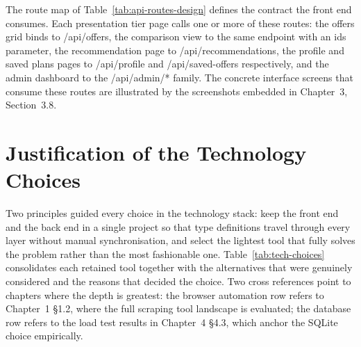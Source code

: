 The route map of Table~\ref{tab:api-routes-design} defines the contract the front end consumes. Each presentation tier page calls one or more of these routes: the offers grid binds to /api/offers, the comparison view to the same endpoint with an ids parameter, the recommendation page to /api/recommendations, the profile and saved plans pages to /api/profile and /api/saved-offers respectively, and the admin dashboard to the /api/admin/* family. The concrete interface screens that consume these routes are illustrated by the screenshots embedded in Chapter~3, Section~3.8.

\section{Justification of the Technology Choices}

Two principles guided every choice in the technology stack: keep the front end and the back end in a single project so that type definitions travel through every layer without manual synchronisation, and select the lightest tool that fully solves the problem rather than the most fashionable one. Table~\ref{tab:tech-choices} consolidates each retained tool together with the alternatives that were genuinely considered and the reasons that decided the choice. Two cross references point to chapters where the depth is greatest: the browser automation row refers to Chapter~1 §1.2, where the full scraping tool landscape is evaluated; the database row refers to the load test results in Chapter~4 §4.3, which anchor the SQLite choice empirically.


